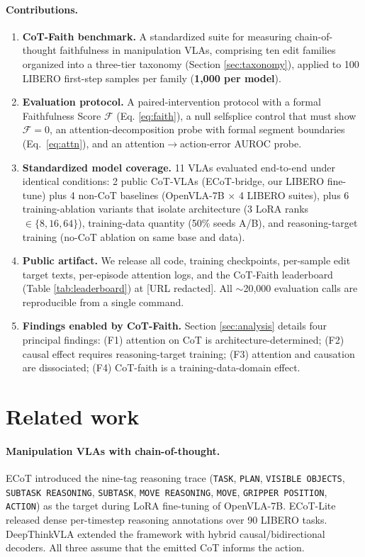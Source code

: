 \documentclass{article}
\begin{document}
\paragraph{Contributions.}
\begin{enumerate}
\item {\bf CoT-Faith benchmark.} A standardized suite for measuring chain-of-thought faithfulness in manipulation VLAs, comprising ten edit families organized into a three-tier taxonomy (Section \ref{sec:taxonomy}), applied to 100 LIBERO first-step samples per family (\textbf{1{,}000 per model}).
\item {\bf Evaluation protocol.} A paired-intervention protocol with a formal Faithfulness Score $\mathcal{F}$ (Eq. \ref{eq:faith}), a null selfsplice control that must show $\mathcal{F}\!=\!0$, an attention-decomposition probe with formal segment boundaries (Eq.~\ref{eq:attn}), and an attention$\to$action-error AUROC probe.
\item {\bf Standardized model coverage.} 11 VLAs evaluated end-to-end under identical conditions: 2 public CoT-VLAs (ECoT-bridge, our LIBERO fine-tune) plus 4 non-CoT baselines (OpenVLA-7B $\times$ 4 LIBERO suites), plus 6 training-ablation variants that isolate architecture (3 LoRA ranks $\in\{8,16,64\}$), training-data quantity (50\% seeds A/B), and reasoning-target training (no-CoT ablation on same base and data).
\item {\bf Public artifact.} We release all code, training checkpoints, per-sample edit target texts, per-episode attention logs, and the CoT-Faith leaderboard (Table \ref{tab:leaderboard}) at [URL redacted]. All $\sim$20{,}000 evaluation calls are reproducible from a single command.
\item {\bf Findings enabled by CoT-Faith.} Section \ref{sec:analysis} details four principal findings: (F1) attention on CoT is architecture-determined; (F2) causal effect requires reasoning-target training; (F3) attention and causation are dissociated; (F4) CoT-faith is a training-data-domain effect.
\end{enumerate}

\section{Related work}
\label{sec:related}

\paragraph{Manipulation VLAs with chain-of-thought.}
ECoT \citep{ecot} introduced the nine-tag reasoning trace (\texttt{TASK}, \texttt{PLAN}, \texttt{VISIBLE OBJECTS}, \texttt{SUBTASK REASONING}, \texttt{SUBTASK}, \texttt{MOVE REASONING}, \texttt{MOVE}, \texttt{GRIPPER POSITION}, \texttt{ACTION}) as the target during LoRA fine-tuning of OpenVLA-7B. ECoT-Lite \citep{ecotlite} released dense per-timestep reasoning annotations over 90 LIBERO tasks. DeepThinkVLA \citep{deepthinkvla} extended the framework with hybrid causal/bidirectional decoders. All three assume that the emitted CoT informs the action.
\end{document}
